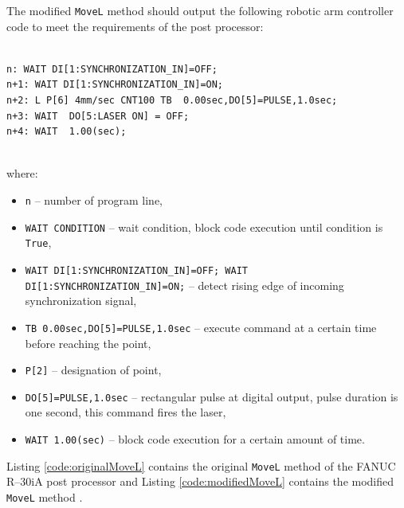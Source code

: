 The modified \texttt{MoveL} method should output the following robotic arm controller code to meet the requirements of the post processor:


\begin{verbatim}

n: WAIT DI[1:SYNCHRONIZATION_IN]=OFF;
n+1: WAIT DI[1:SYNCHRONIZATION_IN]=ON;
n+2: L P[6] 4mm/sec CNT100 TB  0.00sec,DO[5]=PULSE,1.0sec;
n+3: WAIT  DO[5:LASER ON] = OFF;
n+4: WAIT  1.00(sec);
  
\end{verbatim}


where:

\begin{itemize}

    \item \texttt{n} -- number of program line, 
    \item \texttt{WAIT CONDITION} -- wait condition, block code execution until condition  is \texttt{True},
    \item \texttt{WAIT DI[1:SYNCHRONIZATION_IN]=OFF; WAIT DI[1:SYNCHRONIZATION_IN]=ON;} -- detect rising edge of incoming synchronization signal,
    \item \texttt{TB  0.00sec,DO[5]=PULSE,1.0sec} -- execute command at a certain time before reaching the point,
    \item \texttt{P[2]} -- designation of point,
    \item \texttt{DO[5]=PULSE,1.0sec} -- rectangular pulse at digital output, pulse duration is one second, this command fires the laser,
    \item \texttt{WAIT  1.00(sec)} -- block code execution for a certain amount of time.

\end{itemize}

 Listing \ref{code:originalMoveL} contains the original \texttt{MoveL} method of the FANUC R--30iA post processor and Listing \ref{code:modifiedMoveL} contains the modified \texttt{MoveL} method \cite{postmethods}. 


